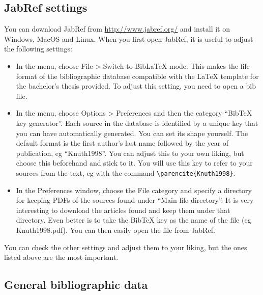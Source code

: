 \subsection{JabRef settings}
\label{sub:jabrefsettings}

You can download JabRef from \url{http://www.jabref.org/} and install it on Windows, MacOS and Linux. When you first open JabRef, it is useful to adjust the following settings:

\begin{itemize}
  \item In the menu, choose File > Switch to BibLaTeX mode. This makes the file format of the bibliographic database compatible with the {\LaTeX} template for the bachelor's thesis provided. To adjust this setting, you need to open a bib file.
  \item In the menu, choose Options > Preferences and then the category ``BibTeX key generator''. Each source in the database is identified by a unique key that you can have automatically generated. You can set its shape yourself. The default format is the first author's last name followed by the year of publication, eg ``Knuth1998''. You can adjust this to your own liking, but choose this beforehand and stick to it. You will use this key to refer to your sources from the text, eg with the command \verb|\parencite{Knuth1998}|.
  \item In the Preferences window, choose the File category and specify a directory for keeping PDFs of the sources found under ``Main file directory''. It is very interesting to download the articles found and keep them under that directory. Even better is to take the BibTeX key as the name of the file (eg Knuth1998.pdf). You can then easily open the file from JabRef.
\end{itemize}

You can check the other settings and adjust them to your liking, but the ones listed above are the most important.

\subsection{General bibliographic data}
\label{sub:generalbibliographicaldata}

